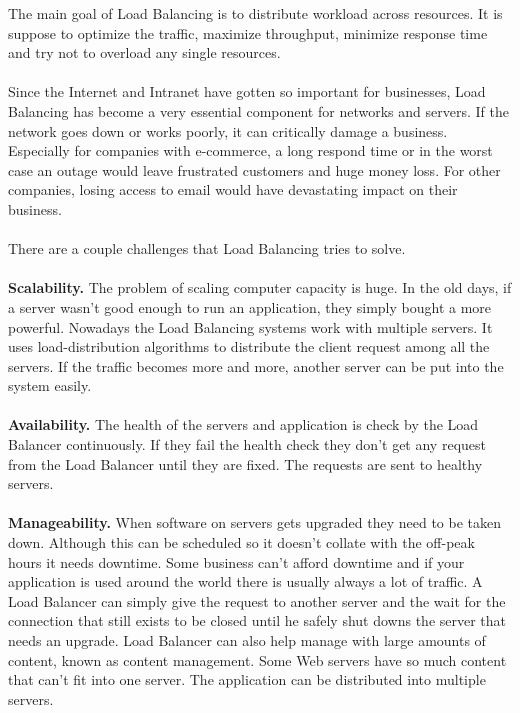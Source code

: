 \documentclass[12p]{article}
\begin{document}
	
	The main goal of Load Balancing is to distribute workload across resources. It is suppose to optimize the traffic, maximize throughput, minimize response time and try not to overload any single resources. \\\\
	Since the Internet and Intranet have gotten so important for businesses, Load Balancing has become a very essential component for networks and servers. If the network goes down or works poorly, it can critically damage a business. Especially for companies with e-commerce, a long respond time or in the worst case an outage would leave frustrated customers and huge money loss. For other companies, losing access to email would have devastating impact on their business.  \cite{lb_SFC} \\\\
	There are a couple challenges that Load Balancing tries to solve. \\\\ 
	\textbf{Scalability.} The problem of scaling computer capacity is huge. In the old days, if a server wasn't good enough to run an application, they simply bought a more powerful. Nowadays the Load Balancing systems work with multiple servers. It uses load-distribution algorithms to distribute the client request among all the servers.
	If the traffic becomes more and more, another server can be put into the system easily. \cite{lb_SFC} \\\\
	\textbf{Availability.} The health of the servers and application is check by the Load Balancer continuously. If they fail the health check they don't get any request from the Load Balancer until they are fixed. The requests are sent to healthy servers. \cite{lb_SFC} \\\\ 
	\textbf{Manageability.} When software on servers gets upgraded they need to be taken down. Although this can be scheduled so it doesn't collate with the off-peak hours it needs downtime. Some business can't afford downtime and if your application is used around the world there is usually always a lot of traffic. A Load Balancer can simply give the request to another server and the wait for the connection that still exists to be closed until he safely shut downs the server that needs an upgrade. 
	Load Balancer can also help manage with large amounts of content, known as content management. Some Web servers have so much content that can't fit into one server. The application can be distributed into multiple servers.\cite{lb_SFC}
	
\end{document}
